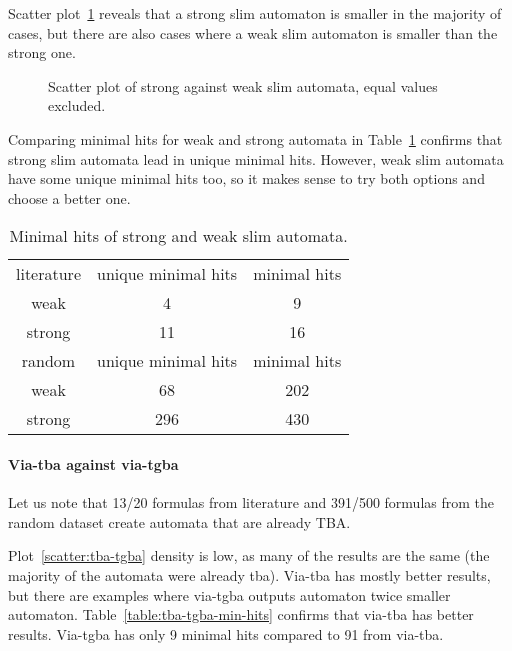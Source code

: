 \documentclass[
	digital,
nolof, nolot
]{fithesis3}
\begin{document}
	Scatter plot~\ref{scatter:weakstrong} reveals that a strong slim automaton is smaller in the majority of cases, but there are also cases where a weak slim automaton is smaller than the strong one.
		\begin{figure}[ht]
			
			\centering 
			\caption{Scatter plot of strong against weak slim automata, equal values excluded. }
			\label{scatter:weakstrong}
		\begin{tikzpicture}
			
		\end{tikzpicture}
	\end{figure}
	
		Comparing minimal hits for weak and strong automata in Table~\ref{table:weakstrongminhits} confirms that strong slim automata lead in unique minimal hits. However, weak slim automata have some unique minimal hits too, so it makes sense to try both options and choose a better one. 
		\begin{table}[ht]
			\centering
			
			\caption{Minimal hits of strong and weak slim automata.}
			\label{table:weakstrongminhits}
			\begin{tabular}{ |c||c|c| } 
				\hline
				literature&unique minimal hits&minimal hits\\
				\hhline{|===|}
				weak&4 & 9\\
				\hline
				strong&11 & 16\\ 
				\hline
				\hline
				random&unique minimal hits&minimal hits\\
				\hhline{|===|}
				weak&68 & 202\\
				\hline
				strong&296 & 430\\ 
				\hline
			\end{tabular}
		\end{table}

		\paragraph{Via-tba against via-tgba}
		Let us note that 13/20 formulas from literature and 391/500 formulas from the random dataset create automata that are already TBA.
		
		Plot~\ref{scatter:tba-tgba} density is low, as many of the results are the same (the majority of the automata were already tba). Via-tba has mostly better results, but there are examples where via-tgba outputs automaton twice smaller automaton. Table~\ref{table:tba-tgba-min-hits} confirms that via-tba has better results. Via-tgba has only 9 minimal hits compared to 91 from via-tba.
		
\end{document}
